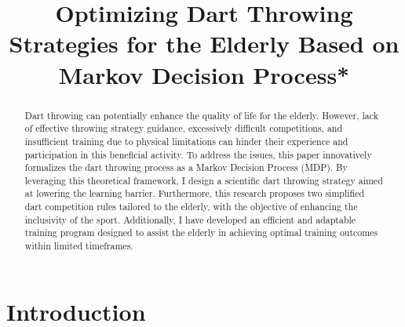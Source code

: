 \documentclass[cjjs]{ipart}
\theoremstyle{plain}
\begin{document}
\begin{frontmatter}

\title[Running title]
{Optimizing Dart Throwing Strategies for the Elderly Based on Markov Decision Process*}



\begin{aug}
    \author{ }
    \address{Beijing No.101 High School,\\
             China\\
             }
    
\end{aug}


\begin{abstract}
\noindent
Dart throwing can potentially enhance the quality of life for the elderly. However, lack of effective throwing strategy guidance, excessively difficult competitions, and insufficient training due to physical limitations can hinder their experience and participation in this beneficial activity. To address the issues, this paper innovatively formalizes the dart throwing process as a Markov Decision Process (MDP). By leveraging this theoretical framework, I design a scientific dart throwing strategy aimed at lowering the learning barrier. Furthermore, this research proposes two simplified dart competition rules tailored to the elderly, with the objective of enhancing the inclusivity of the sport. Additionally, I have developed an efficient and adaptable training program designed to assist the elderly in achieving optimal training outcomes within limited timeframes.
\end{abstract}

\begin{keyword}
\end{keyword}

\end{frontmatter}
    
\section{Introduction}
\end{document}

